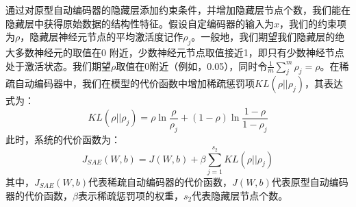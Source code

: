 \documentclass[oneside]{ZJUthesis}
\begin{document}
通过对原型自动编码器的隐藏层添加约束条件，并增加隐藏层节点个数，我们能在隐藏层中获得原始数据的结构性特征\cite{wright2014sparse}。假设自定编码器的输入为$x$，我们的约束项为$\rho$，隐藏层神经元节点的平均激活度记作$\rho_j$。一般地，我们期望我们隐藏层的绝大多数神经元的取值在0 附近，少数神经元节点取值接近1，即只有少数神经节点处于激活状态。我们期望$\rho$取值在0附近（例如，0.05），同时令$\frac{1}{m}\sum_j^m{\rho_j}=\rho$。在稀疏自动编码器中，我们在模型的代价函数中增加稀疏惩罚项$KL(\rho||\rho_j)$，其表达式为：
\begin{equation}
	KL(\rho||\rho_j)=\rho \ln \frac{\rho}{\rho_j} + (1-\rho)\ln \frac{1-\rho}{1-\rho_j}
\end{equation}
此时，系统的代价函数为：
\begin{equation}
	J_{SAE}(W,b)=J(W,b)+\beta \sum_{j=1}^{s_2}KL(\rho||\rho_j)
\end{equation}
其中，$J_{SAE}(W,b)$代表稀疏自动编码器的代价函数，$J(W,b)$代表原型自动编码器的代价函数，$\beta$表示稀疏惩罚项的权重，$s_2$代表隐藏层节点个数\cite{24}。
\end{document}
